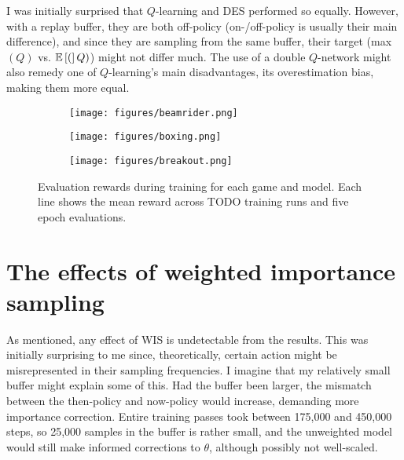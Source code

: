 \documentclass{article}
\begin{document}
I was initially surprised that \(Q\)-learning and DES performed so equally. However, with a replay buffer, they are both off-policy (on-/off-policy is usually their main difference), and since they are sampling from the same buffer, their target (max\((Q)\) vs. \(\mathbb{E}\left[ ( \right]Q)\)) might not differ much. The use of a double \(Q\)-network might also remedy one of \(Q\)-learning's main disadvantages, its overestimation bias, making them more equal.

\begin{figure}[h]
    \centering
    \begin{subfigure}[b]{0.7\textwidth}
        \texttt{[image: figures/beamrider.png]}
    \end{subfigure}
    
    \vspace{1em}  %
    
    \begin{subfigure}[b]{0.7\textwidth}
        \texttt{[image: figures/boxing.png]}
    \end{subfigure}
    
    \vspace{1em}  %
    
    \begin{subfigure}[b]{0.7\textwidth}
        \texttt{[image: figures/breakout.png]}
    \end{subfigure} 
    \caption{Evaluation rewards during training for each game and model. Each line shows the mean reward across TODO training runs and five epoch evaluations.}
    \label{fig:results}
\end{figure}

\section{The effects of weighted importance sampling}
As mentioned, any effect of WIS is undetectable from the results. This was initially surprising to me since, theoretically, certain action might be misrepresented in their sampling frequencies. I imagine that my relatively small buffer might explain some of this. Had the buffer been larger, the mismatch between the then-policy and now-policy would increase, demanding more importance correction. Entire training passes took between 175,000 and 450,000 steps, so 25,000 samples in the buffer is rather small, and the unweighted model would still make informed corrections to \(\theta\), although possibly not well-scaled.
\end{document}
